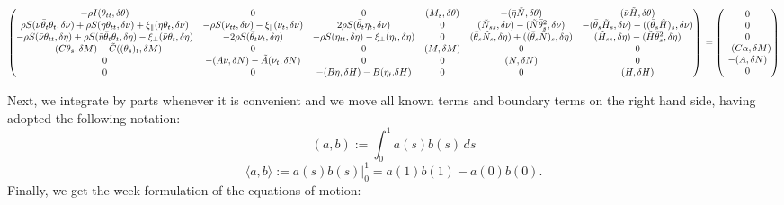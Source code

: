 \[\begin{pmatrix}
-\rho I (\theta_{tt},\delta\theta) & 0 & 0 & (M_s,\delta\theta) & -(\bar{\eta}\tilde{N},\delta\theta) & (\bar{\nu}\tilde{H},\delta\theta) 
\\
\rho S(\bar{\nu}\bar{\theta}_t\theta_t,\delta\nu) + \rho S (\bar{\eta}\theta_{tt},\delta\nu) + \xi_{\parallel}(\bar{\eta}\theta_t,\delta\nu) & -\rho S (\nu_{tt},\delta\nu) -\xi_{\parallel}(\nu_t,\delta\nu) & 2 \rho S(\bar{\theta}_t\eta_t,\delta\nu) & 0 & (\tilde{N}_{ss},\delta\nu) - (\tilde{N}\bar{\theta}_s^2,\delta\nu) & -(\bar{\theta}_s \tilde{H}_s,\delta\nu) - ((\bar{\theta}_s \tilde{H})_s,\delta\nu) 
\\
-\rho S (\bar{\nu}\theta_{tt},\delta\eta) + \rho S (\bar{\eta}\bar{\theta}_t\theta_t,\delta\eta) - \xi_{\perp}(\bar{\nu}\theta_t,\delta\eta) & - 2\rho S (\bar{\theta}_t \nu_t,\delta\eta) & -\rho S (\eta_{tt},\delta\eta) - \xi_{\perp}(\eta_t,\delta\eta) & 0 & (\bar{\theta}_s \tilde{N}_s, \delta\eta) + ((\bar{\theta}_s \tilde{N})_s,\delta\eta) & (\tilde{H}_{ss},\delta\eta) - (\tilde{H}\bar{\theta}_s^2,\delta\eta) 
\\
-(C\theta_s,\delta M) -\tilde{C}((\theta_s)_t,\delta M) & 0 & 0 & (M, \delta M) & 0 & 0 
\\
0 & -(A\nu,\delta N) -\tilde{A}(\nu_t,\delta N) & 0 & 0 & (N, \delta N) & 0 
\\
0 & 0 & -(B\eta,\delta H) - \tilde{B}(\eta_t. \delta H) & 0 & 0 & (H, \delta H) 
\end{pmatrix}
\\ =
\begin{pmatrix}
0\\
0\\
0\\
-(C\alpha,\delta M) \\
-(A,\delta N) \\
0
\end{pmatrix}\]

Next, we integrate by parts whenever it is convenient and we move all known terms and boundary terms on the right hand side, having adopted the following notation:
\[
(a,b) := \int_0^1 a(s) b(s) \, ds
\]
\[
\langle a,b \rangle := a(s) b(s) \big|^1_0 = a(1)b(1)-a(0)b(0).
\]
Finally, we get the week formulation of the equations of motion:

